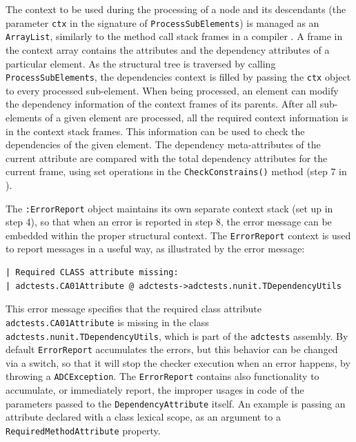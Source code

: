 The context to be used during the processing of a node and its descendants (the parameter \texttt{ctx} in the signature of \texttt{Pro\-cess\-Sub\-Ele\-ments}) is managed as an \texttt{Array\-List}, similarly to the method call stack frames in a compiler \cite{aho.88}.
A frame in the context array contains the attributes and the dependency attributes of a particular element. As the structural tree is traversed by calling \texttt{Pro\-cess\-Sub\-Ele\-ments}, the dependencies context is filled by passing the \texttt{ctx} object to every processed sub-element. When being processed, an element can modify the dependency information of the context frames of its parents.
After all sub-elements of a given element are processed, all the required context information is in the context stack frames. This information can be used to check the dependencies of the given element. The dependency meta-attributes of the current attribute are compared with the total dependency attributes for the current frame, using set operations in the \texttt{Check\-Con\-strains()} method (step 7 in ).
 
The \texttt{:Error\-Re\-port} object maintains its own separate context stack (set up in step 4), so that when an error is reported in step 8, the error message can be embedded within the proper structural context. The \texttt{Error\-Re\-port} context is used to report messages in a useful way, as illustrated by the error message:

\begin{scriptsize}
\begin{verbatim}
| Required CLASS attribute missing:
| adctests.CA01Attribute @ adctests->adctests.nunit.TDependencyUtils
\end{verbatim}
\end{scriptsize}

\noindent This error message specifies that the required class attribute \texttt{adc\-tests.CA01\-Attri\-bu\-te} is missing in the class \texttt{adc\-tests.nunit.TDe\-pe\-ndency\-Utils}, which is part of the \texttt{adctests} assembly.
%
By default \texttt{Error\-Re\-port} accumulates the errors, but this behavior can be changed via a switch, so that it will stop the checker execution when an error happens, by throwing a \texttt{ADC\-Excep\-tion}. The \texttt{Error\-Re\-port} contains also functionality to accumulate, or immediately report, the improper usages in code of the parameters passed to the \texttt{De\-pe\-ndency\-Attri\-bu\-te} itself. An example is passing an attribute declared with a class lexical scope, as an argument to a \texttt{Re\-quired\-Me\-thod\-Attri\-bu\-te} property.

